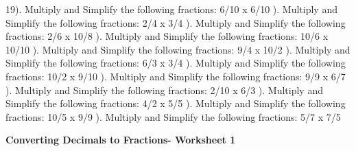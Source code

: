 \documentclass{article}%
\begin{document}
19). Multiply and Simplify the following fractions: 6/10 x 6/10%
\newline%
\newline%
). Multiply and Simplify the following fractions: 2/4 x 3/4%
\newline%
\newline%
). Multiply and Simplify the following fractions: 2/6 x 10/8%
\newline%
\newline%
). Multiply and Simplify the following fractions: 10/6 x 10/10%
\newline%
\newline%
). Multiply and Simplify the following fractions: 9/4 x 10/2%
\newline%
\newline%
). Multiply and Simplify the following fractions: 6/3 x 3/4%
\newline%
\newline%
). Multiply and Simplify the following fractions: 10/2 x 9/10%
\newline%
\newline%
). Multiply and Simplify the following fractions: 9/9 x 6/7%
\newline%
\newline%
). Multiply and Simplify the following fractions: 2/10 x 6/3%
\newline%
\newline%
). Multiply and Simplify the following fractions: 4/2 x 5/5%
\newline%
\newline%
). Multiply and Simplify the following fractions: 10/5 x 9/9%
\newline%
\newline%
). Multiply and Simplify the following fractions: 5/7 x 7/5%
\newline%
\newline%
\newline%
\pagebreak%
\large%
\begin{center}%
\textbf{Converting Decimals to Fractions- Worksheet 1}%
\newline%
\end{center} \normalsize%
\end{document}
